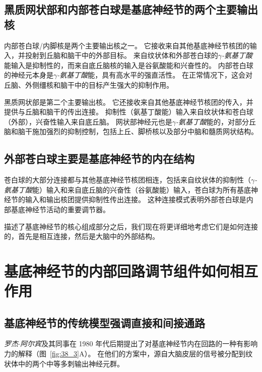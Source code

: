 \subsection{黑质网状部和内部苍白球是基底神经节的两个主要输出核}

内部苍白球/内脚核是两个主要输出核之一。
它接收来自其他基底神经节核团的输入，并投射到丘脑和脑干中的外部目标。
来自纹状体和外部苍白球的\textit{$\gamma$-氨基丁酸}能输入是抑制性的，而来自底丘脑核的输入是谷氨酸能和兴奋性的。
内部苍白球的神经元本身是\textit{$\gamma$-氨基丁酸}能，具有高水平的强直活性。
在正常情况下，这会对丘脑、外侧缰核和脑干中的目标产生强大的抑制作用。


黑质网状部是第二个主要输出核。
它还接收来自其他基底神经节核团的传入，并提供与丘脑和脑干的传出连接。
抑制性（氨基丁酸能）输入来自纹状体和苍白球（外部），兴奋性输入来自底丘脑。
网状部神经元也是\textit{$\gamma$-氨基丁酸}能的，对部分丘脑和脑干施加强烈的抑制控制，包括上丘、脚桥核以及部分中脑和髓质网状结构。



\subsection{外部苍白球主要是基底神经节的内在结构}

苍白球的大部分连接都与其他基底神经节核团相连，包括来自纹状体的抑制性（\textit{$\gamma$-氨基丁酸}能）输入和来自底丘脑的兴奋性（谷氨酸能）输入，苍白球为所有基底神经节的输入和输出核团提供抑制性传出连接。
这种连接模式表明外部苍白球是内部基底神经节活动的重要调节器。


描述了基底神经节的核心组成部分之后，我们现在将更详细地考虑它们是如何连接的，首先是相互连接，然后是大脑中的外部结构。



\section{基底神经节的内部回路调节组件如何相互作用}

\subsection{基底神经节的传统模型强调直接和间接通路}

\textit{罗杰$\cdot$阿尔宾}及其同事在 1980 年代后期提出了对基底神经节内在回路的一种有影响力的解释（图~\ref{fig:38_3}A）。
在他们的方案中，源自大脑皮层的信号被分配到纹状体中的两个中等多刺输出神经元群。


